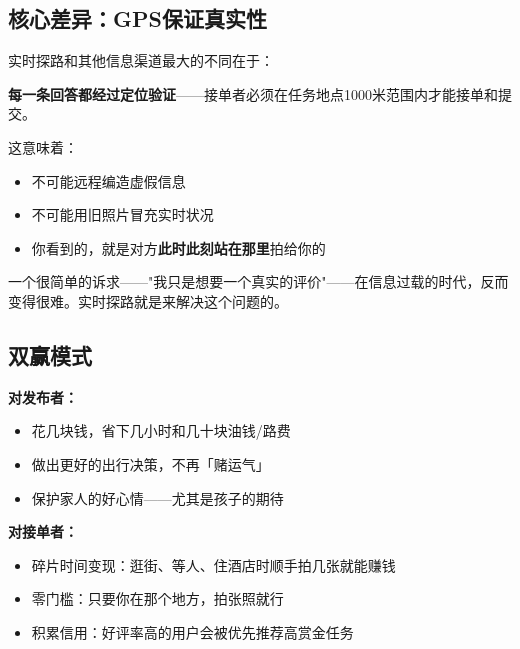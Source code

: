 \documentclass[12pt, a4paper]{article}
\begin{document}
\subsection{核心差异：GPS保证真实性}

\begin{mdframed}[style=infostyle]
实时探路和其他信息渠道最大的不同在于：

\vspace{6pt}
\textbf{每一条回答都经过定位验证}——接单者必须在任务地点1000米范围内才能接单和提交。

\vspace{6pt}
这意味着：
\begin{itemize}[leftmargin=1.5em, itemsep=2pt]
    \item 不可能远程编造虚假信息
    \item 不可能用旧照片冒充实时状况
    \item 你看到的，就是对方\textbf{此时此刻站在那里}拍给你的
\end{itemize}

\vspace{6pt}
一个很简单的诉求——"我只是想要一个真实的评价"——在信息过载的时代，反而变得很难。实时探路就是来解决这个问题的。
\end{mdframed}

\subsection{双赢模式}

\begin{mdframed}[style=hopestyle]
\textbf{对发布者：}
\begin{itemize}[leftmargin=1.5em, itemsep=2pt]
    \item 花几块钱，省下几小时和几十块油钱/路费
    \item 做出更好的出行决策，不再「赌运气」
    \item 保护家人的好心情——尤其是孩子的期待
\end{itemize}

\vspace{6pt}
\textbf{对接单者：}
\begin{itemize}[leftmargin=1.5em, itemsep=2pt]
    \item 碎片时间变现：逛街、等人、住酒店时顺手拍几张就能赚钱
    \item 零门槛：只要你在那个地方，拍张照就行
    \item 积累信用：好评率高的用户会被优先推荐高赏金任务
\end{itemize}
\end{mdframed}
\end{document}
